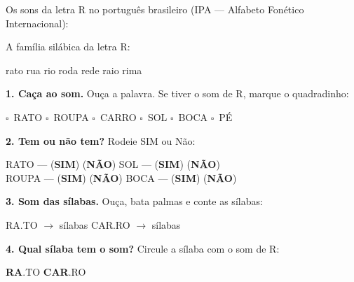 
\begin{sonsdaletra}
Os sons da letra R no portugu\^es{} brasileiro (IPA --- Alfabeto Fon\'etico Internacional):

\end{sonsdaletra}


\begin{familiasilabica}
A fam\'ilia sil\'abica da letra R:

\begin{center}
rato \quad rua \quad rio \quad roda \quad rede \quad raio \quad rima
\end{center}
\end{familiasilabica}


\begin{somletra}
\textbf{1. Ca\c{c}a ao som.} Ou\c{c}a a palavra. Se tiver o som de R, marque o quadradinho:
\begin{center}
$\square$~RATO \quad $\square$~ROUPA \quad $\square$~CARRO \quad $\square$~SOL \quad $\square$~BOCA \quad $\square$~P\'E
\end{center}

\textbf{2. Tem ou n\~ao{} tem?} Rodeie SIM ou N\~ao:
\begin{center}
RATO --- (\textbf{SIM}) (\textbf{N\~AO}) \quad SOL --- (\textbf{SIM}) (\textbf{N\~AO}) \\ ROUPA --- (\textbf{SIM}) (\textbf{N\~AO}) \quad BOCA --- (\textbf{SIM}) (\textbf{N\~AO})
\end{center}
\end{somletra}

\begin{somsilaba}
\textbf{3. Som das s\'ilabas.} Ou\c{c}a, bata palmas e conte as s\'ilabas:
\begin{center}
RA.TO $\rightarrow$ \underline{\hspace{1cm}} s\'ilabas \quad CAR.RO $\rightarrow$ \underline{\hspace{1cm}} s\'ilabas
\end{center}

\textbf{4. Qual s\'ilaba tem o som?} Circule a s\'ilaba com o som de R:
\begin{center}
\textbf{RA}.TO \quad \textbf{CAR}.RO
\end{center}
\end{somsilaba}


